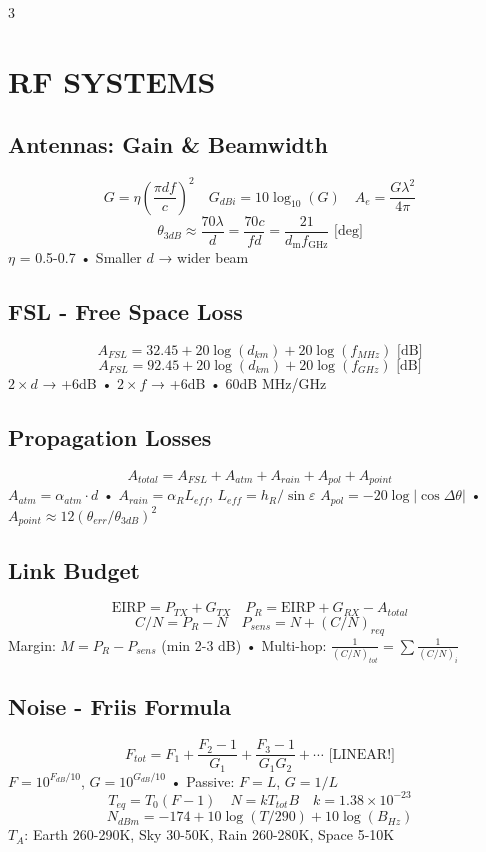 \documentclass[a4paper,6pt]{extarticle}
\begin{document}
\begin{multicols}{3}
\footnotesize

\section*{RF SYSTEMS}

\subsection*{Antennas: Gain \& Beamwidth}
$$G = \eta \left(\frac{\pi d f}{c}\right)^2 \quad G_{dBi} = 10\log_{10}(G) \quad A_e = \frac{G \lambda^2}{4\pi}$$
$$\boxed{\theta_{3dB} \approx \frac{70\lambda}{d} = \frac{70c}{fd} = \frac{21}{d_{\text{m}} f_{\text{GHz}}}} \text{ [deg]}$$
$\eta$ = 0.5-0.7 • Smaller $d$ → wider beam

\subsection*{FSL - Free Space Loss}
$$\boxed{A_{FSL} = 32.45 + 20\log(d_{km}) + 20\log(f_{MHz})} \text{ [dB]}$$
$$\boxed{A_{FSL} = 92.45 + 20\log(d_{km}) + 20\log(f_{GHz})} \text{ [dB]}$$
$2\times d$ → +6dB • $2\times f$ → +6dB • 60dB MHz/GHz

\subsection*{Propagation Losses}
$$\boxed{A_{total} = A_{FSL} + A_{atm} + A_{rain} + A_{pol} + A_{point}}$$
$A_{atm} = \alpha_{atm} \cdot d$ • $A_{rain} = \alpha_R L_{eff}$, $L_{eff} = h_R/\sin\varepsilon$
$A_{pol} = -20\log|\cos\Delta\theta|$ • $A_{point} \approx 12(\theta_{err}/\theta_{3dB})^2$

\subsection*{Link Budget}
$$\text{EIRP} = P_{TX} + G_{TX} \quad P_R = \text{EIRP} + G_{RX} - A_{total}$$
$$C/N = P_R - N \quad P_{sens} = N + (C/N)_{req}$$
Margin: $M = P_R - P_{sens}$ (min 2-3 dB) • Multi-hop: $\frac{1}{(C/N)_{tot}} = \sum \frac{1}{(C/N)_i}$

\subsection*{Noise - Friis Formula}
$$\boxed{F_{tot} = F_1 + \frac{F_2-1}{G_1} + \frac{F_3-1}{G_1 G_2} + \cdots} \text{ [LINEAR!]}$$
$F = 10^{F_{dB}/10}$, $G = 10^{G_{dB}/10}$ • Passive: $F = L$, $G = 1/L$
$$T_{eq} = T_0(F-1) \quad N = kT_{tot}B \quad k = 1.38 \times 10^{-23}$$
$$N_{dBm} = -174 + 10\log(T/290) + 10\log(B_{Hz})$$
$T_A$: Earth 260-290K, Sky 30-50K, Rain 260-280K, Space 5-10K


\end{multicols}
\end{document}
